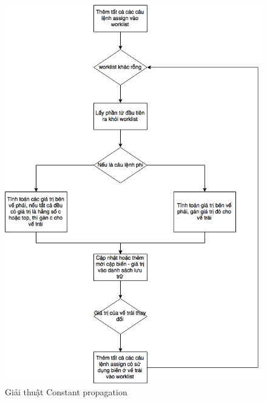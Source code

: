 \begin{figure}
	\centering
	\includegraphics[scale=0.75]{image/constantPropagationAlgo}
	\caption{Giải thuật Constant propagation}
	\label{fig:constantpropagationalgo}
\end{figure}

